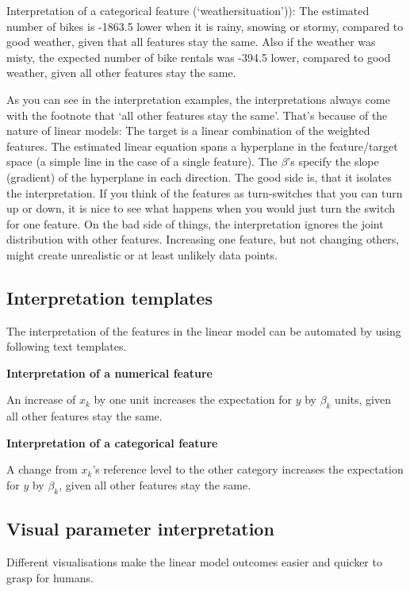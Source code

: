 \documentclass[12pt,]{krantz}
\theoremstyle{definition}
\theoremstyle{definition}
\theoremstyle{definition}
\theoremstyle{remark}
\begin{document}
Interpretation of a categorical feature (`weathersituation')): The
estimated number of bikes is -1863.5 lower when it is rainy, snowing or
stormy, compared to good weather, given that all features stay the same.
Also if the weather was misty, the expected number of bike rentals was
-394.5 lower, compared to good weather, given all other features stay
the same.

As you can see in the interpretation examples, the interpretations
always come with the footnote that `all other features stay the same'.
That's because of the nature of linear models: The target is a linear
combination of the weighted features. The estimated linear equation
spans a hyperplane in the feature/target space (a simple line in the
case of a single feature). The \(\beta\)'s specify the slope (gradient)
of the hyperplane in each direction. The good side is, that it isolates
the interpretation. If you think of the features as turn-switches that
you can turn up or down, it is nice to see what happens when you would
just turn the switch for one feature. On the bad side of things, the
interpretation ignores the joint distribution with other features.
Increasing one feature, but not changing others, might create
unrealistic or at least unlikely data points.

\subsection{Interpretation templates}\label{interpretation-templates}

The interpretation of the features in the linear model can be automated
by using following text templates.

\textbf{Interpretation of a numerical feature}

An increase of \(x_{k}\) by one unit increases the expectation for \(y\)
by \(\beta_k\) units, given all other features stay the same.

\textbf{Interpretation of a categorical feature}

A change from \(x_{k}\)'s reference level to the other category
increases the expectation for \(y\) by \(\beta_{k}\), given all other
features stay the same.

\subsection{Visual parameter
interpretation}\label{visual-parameter-interpretation}

Different visualisations make the linear model outcomes easier and
quicker to grasp for humans.
\end{document}
